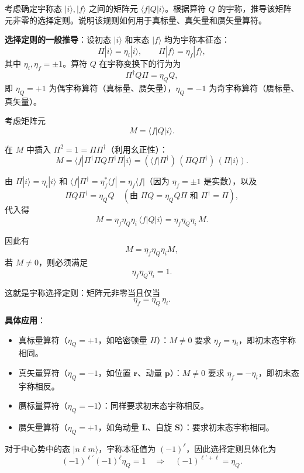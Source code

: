 \begin{question}
考虑确定宇称态 $|i\rangle,|f\rangle$ 之间的矩阵元 $\langle f|Q|i\rangle$。根据算符 $Q$ 的宇称，推导该矩阵元非零的选择定则。说明该规则如何用于真标量、真矢量和赝矢量算符。
\end{question}
\begin{solution}
	\textbf{选择定则的一般推导}：设初态 $|i\rangle$ 和末态 $|f\rangle$ 均为宇称本征态：
	\[
	\Pi|i\rangle=\eta_i|i\rangle,\qquad \Pi|f\rangle=\eta_f|f\rangle,
	\]
	其中 $\eta_i,\eta_f=\pm1$。算符 $Q$ 在宇称变换下的行为为
	\[
	\Pi^\dagger Q\Pi = \eta_Q Q,
	\]
	即 $\eta_Q=+1$ 为偶宇称算符（真标量、赝矢量），$\eta_Q=-1$ 为奇宇称算符（赝标量、真矢量）。

	考虑矩阵元
	\[
	M = \langle f|Q|i\rangle.
	\]

	在 $M$ 中插入 $\Pi^2=1 = \Pi\Pi^\dagger$（利用幺正性）：
	\[
	M = \langle f|\Pi^\dagger\Pi Q \Pi^\dagger\Pi|i\rangle
	= (\langle f|\Pi^\dagger)\,(\Pi Q\Pi^\dagger)\,(\Pi|i\rangle).
	\]

	由 $\Pi|i\rangle=\eta_i|i\rangle$ 和 $\langle f|\Pi^\dagger = \eta_f^*\langle f| = \eta_f\langle f|$（因为 $\eta_f=\pm1$ 是实数），以及
	\[
	\Pi Q\Pi^\dagger = \eta_Q Q \quad(\text{由 }\Pi Q = \eta_Q Q\Pi\text{ 和 }\Pi^\dagger=\Pi),
	\]
	代入得
	\[
	M = \eta_f\eta_Q\eta_i\,\langle f|Q|i\rangle = \eta_f\eta_Q\eta_i\,M.
	\]

	因此有
	\[
	M = \eta_f\eta_Q\eta_i M,
	\]
	若 $M\neq0$，则必须满足
	\[
	\eta_f\eta_Q\eta_i = 1.
	\]

	这就是宇称选择定则：矩阵元非零当且仅当
	\[
	\boxed{\eta_f = \eta_Q\,\eta_i}.
	\]

	\textbf{具体应用}：
	\begin{itemize}
	\item 真标量算符（$\eta_Q=+1$，如哈密顿量 $H$）：$M\neq0$ 要求 $\eta_f=\eta_i$，即初末态宇称相同。
	\item 真矢量算符（$\eta_Q=-1$，如位置 $\mathbf r$、动量 $\mathbf p$）：$M\neq0$ 要求 $\eta_f=-\eta_i$，即初末态宇称相反。
	\item 赝标量算符（$\eta_Q=-1$）：同样要求初末态宇称相反。
	\item 赝矢量算符（$\eta_Q=+1$，如角动量 $\mathbf L$、自旋 $\mathbf S$）：要求初末态宇称相同。
	\end{itemize}

	对于中心势中的态 $|n\ell m\rangle$，宇称本征值为 $(-1)^\ell$，因此选择定则具体化为
	\[
	(-1)^{\ell'}(-1)^{\ell}\eta_Q = 1 \quad\Longrightarrow\quad (-1)^{\ell'+\ell} = \eta_Q.
	\]
	\end{solution}

